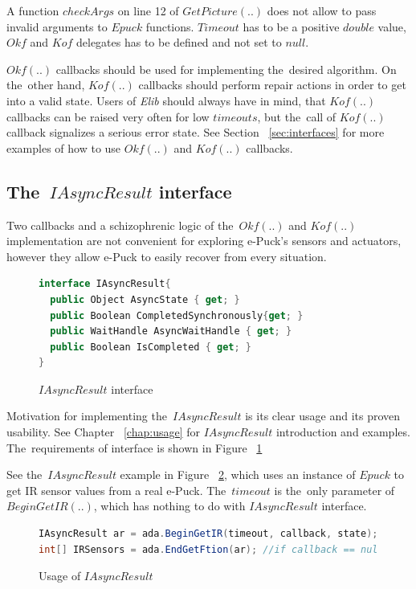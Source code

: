   A function $checkArgs$ on line 12 of $GetPicture(..)$ does not allow to pass invalid arguments
  to $Epuck$ functions. $Timeout$ has to be a positive $double$ value, $Okf$ and $Kof$ delegates 
  has to be defined and not set to $null$.

  $Okf(..)$ callbacks should be used for implementing the~desired algorithm.
  On the~other hand, $Kof(..)$ callbacks should perform repair actions in order to get into a valid state.
  Users of {\it Elib} should always have in mind,
  that $Kof(..)$ callbacks can be raised very often for low $timeouts$,
  but the~call of $Kof(..)$ callback signalizes a serious error state.
  See Section ~\ref{sec:interfaces} for more examples of how to use $Okf(..)$ and $Kof(..)$ callbacks.


\subsection{The~$IAsyncResult$ interface} \label{sec:iasync}
  Two callbacks and a schizophrenic logic of the~$Okf(..)$ and $Kof(..)$ implementation are not
  convenient for exploring e-Puck's sensors and actuators, 
  however they allow e-Puck to easily recover from every situation.

\begin{figure}[!hbp]
\begin{lstlisting}[language=cs]
interface IAsyncResult{
  public Object AsyncState { get; }
  public Boolean CompletedSynchronously{get; } 
  public WaitHandle AsyncWaitHandle { get; }
  public Boolean IsCompleted { get; }
}
\end{lstlisting}
\caption{$IAsyncResult$ interface}
\label{interface}
\end{figure}

  Motivation for implementing the~$IAsyncResult$ is its clear usage and its proven usability.
  See Chapter ~\ref{chap:usage} for $IAsyncResult$ introduction and examples.
  The~requirements of interface is shown in Figure ~\ref{interface}

  See the~$IAsyncResult$ example in Figure ~\ref{arexample}, which uses an instance
  of $Epuck$ to get IR sensor values from a real e-Puck. The~$timeout$ is the~only parameter of $BeginGetIR(..)$,
  which has nothing to do with $IAsyncResult$ interface.

\begin{figure}[!hbp]
\begin{lstlisting}[language=cs]
IAsyncResult ar = ada.BeginGetIR(timeout, callback, state);            
int[] IRSensors = ada.EndGetFtion(ar); //if callback == null
\end{lstlisting}
\caption{Usage of $IAsyncResult$}\label{arexample}
\end{figure}

